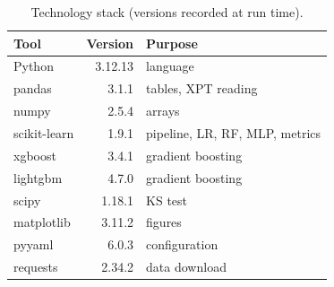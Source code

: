 \begin{table}[t]
\centering
\footnotesize
\caption{Technology stack (versions recorded at run time).}
\label{tab:stack}
\begin{tabular}{lrl}
\toprule
Tool & Version & Purpose \\
\midrule
Python & 3.12.13 & language \\
pandas & 3.1.1 & tables, XPT reading \\
numpy & 2.5.4 & arrays \\
scikit-learn & 1.9.1 & pipeline, LR, RF, MLP, metrics \\
xgboost & 3.4.1 & gradient boosting \\
lightgbm & 4.7.0 & gradient boosting \\
scipy & 1.18.1 & KS test \\
matplotlib & 3.11.2 & figures \\
pyyaml & 6.0.3 & configuration \\
requests & 2.34.2 & data download \\
\bottomrule
\end{tabular}
\end{table}
